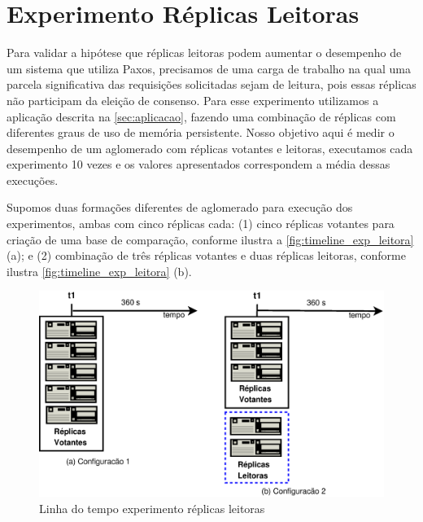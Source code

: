 \begin{table}[htb]
\end{table}


\section{Experimento Réplicas Leitoras}\label{sec:experimento_replicas_leitoras}

Para validar a hipótese que réplicas leitoras podem aumentar o desempenho de um sistema
que utiliza Paxos, precisamos de uma carga de trabalho na qual uma parcela significativa
das requisições solicitadas sejam de leitura, pois essas réplicas não participam da
eleição de consenso. Para esse experimento utilizamos a aplicação descrita na
\autoref{sec:aplicacao}, fazendo uma combinação de réplicas com diferentes graus de uso de
memória persistente. Nosso objetivo aqui é medir o desempenho de um aglomerado com
réplicas votantes e leitoras, executamos cada experimento 10 vezes e os valores
apresentados correspondem a média dessas execuções.

Supomos duas formações diferentes de aglomerado para execução dos experimentos, ambas com
cinco réplicas cada: (1) cinco réplicas votantes para criação de uma base de comparação,
conforme ilustra a \autoref{fig:timeline_exp_leitora} (a); e (2) combinação de três
réplicas votantes e duas réplicas leitoras, conforme ilustra
\autoref{fig:timeline_exp_leitora} (b).

\begin{figure}[ht]
  \centering
  \includegraphics[width=14cm]{conteudo/capitulos/figuras/timeline_exp_leitora.eps}
  \caption{Linha do tempo experimento réplicas leitoras}
  \label{fig:timeline_exp_leitora}
\end{figure}

